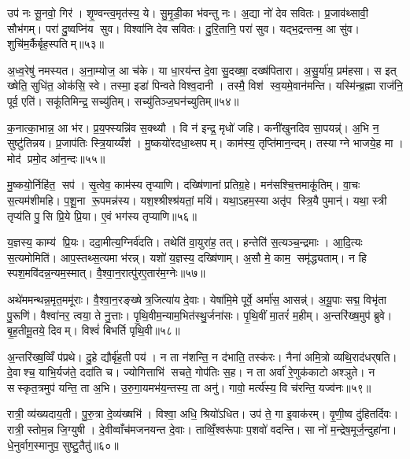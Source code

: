 उप॑ नः सू॒नवो॒ गिर॑। शृ॒ण्वन्त्व॒मृत॑स्य॒ ये। सु॒मृ॒डी॒का भ॑वन्तु नः। अ॒द्या नो॑ देव सवितः। प्र॒जाव॑थ्सावी॒ सौभ॑गम्। परा॑ दु॒ष्वप्नि॑य सुव। विश्वा॑नि देव सवितः। दु॒रि॒तानि॒ परा॑ सुव। यद्भ॒द्रन्तन्म॒ आ सु॑व। शुचि॑म॒र्कैर्बृह॒स्पतिम्॥५३॥

अ॒ध्व॒रेषु॑ नमस्यत। अ॒ना॒म्योज॒ आ च॑के। या धा॒रय॑न्त दे॒वा सु॒दख्षा॒ दख्ष॑पितारा। अ॒सु॒र्या॑य॒ प्रम॑हसा। स इत् ख्षेति॒ सुधि॑त॒ ओक॑सि॒ स्वे। तस्मा॒ इडा॑ पिन्वते विश्व॒दानी। तस्मै॒ विश॑ स्व॒यमे॒वान॑मन्ति। यस्मि॑न्ब्र॒ह्मा राज॑नि॒ पूर्व॒ एति॑। सकू॑तिमिन्द्र॒ सच्यु॑तिम्। सच्यु॑तिञ्ज॒घन॑च्युतिम्॥५४॥

क॒नात्का॒भान्न॒ आ भ॑र। प्र॒य॒फ्स्यन्नि॑व स॒क्थ्यौ। वि न॑ इन्द्र॒ मृधो॑ जहि। कनी॑खुनदिव सा॒पयन्न्॑। अ॒भि न॒ सुष्टु॑तिन्नय। प्र॒जाप॑तिः स्त्रि॒याय्यँश॑। मु॒ष्कयो॑रदधा॒थ्सपम्। काम॑स्य॒ तृप्ति॑मान॒न्दम्। तस्याग्ने भाजये॒ह मा। मोद॑ प्रमो॒द आ॑न॒न्दः॥५५॥

मु॒ष्कयो॒र्निहि॑त॒ सप॑। सृ॒त्वेव॒ काम॑स्य तृप्याणि। दख्षि॑णानां प्रतिग्र॒हे। मन॑सश्चि॒त्तमाकू॑तिम्। वा॒चः स॒त्यम॑शीमहि। प॒शू॒ना रू॒पमन्न॑स्य। यश॒श्श्रीश्श्र॑यतां॒ मयि॑। यथा॒ऽहम॒स्या अतृ॑प स्त्रि॒यै पुमान्॑। यथा॒ स्त्री तृप्य॑ति पु॒सि प्रि॒ये प्रि॒या। ए॒वं भग॑स्य तृप्याणि॥५६॥

य॒ज्ञस्य॒ काम्य॑ प्रि॒यः। ददा॒मीत्य॒ग्निर्व॑दति। तथेति॑ वा॒युरा॑ह॒ तत्। हन्तेति॑ स॒त्यञ्च॒न्द्रमाः। आ॒दि॒त्यः स॒त्यमोमिति॑। आप॒स्तथ्स॒त्यमा भ॑रन्न्। यशो॑ य॒ज्ञस्य॒ दख्षि॑णाम्। अ॒सौ मे॒ काम॒ समृ॑द्ध्यताम्। न हि स्पश॒मवि॑दन्न॒न्यम॒स्मात्। वै॒श्वा॒न॒रात्पु॑रए॒तार॑म॒ग्नेः॥५७॥

अथे॑ममन्थन्न॒मृत॒ममू॑राः। वै॒श्वा॒न॒रङ्ख्षेत्र॒जित्या॑य दे॒वाः। येषा॑मि॒मे पूर्वे॒ अर्मा॑स॒ आसन्न्॑। अ॒यू॒पाः सद्म॒ विभृ॑ता पु॒रूणि॑। वैश्वा॑नर॒ त्वया॒ ते नु॒त्ताः। पृ॒थि॒वीम॒न्याम॒भित॑स्थु॒र्जना॑सः। पृ॒थि॒वीं मा॒तरं॑ म॒हीम्। अ॒न्तरि॑ख्ष॒मुप॑ ब्रुवे। बृ॒ह॒तीमू॒तये॒ दिवम्। विश्वं॑ बिभर्ति पृथि॒वी॥५८॥

अ॒न्तरि॑ख्ष॒व्विँ प॑प्रथे। दु॒हे द्यौर्बृ॑ह॒ती पय॑। न ता न॑शन्ति॒ न द॑भाति॒ तस्क॑रः। नैना॑ अमि॒त्रो व्यथि॒राद॑धर्‌षति। दे॒वाश्च॒ याभि॒र्यज॑ते॒ ददा॑ति च। ज्योगित्ताभि॑ सचते॒ गोप॑तिः स॒ह। न ता अर्वा॑ रे॒णुक॑काटो अश्ञुते। न सस्कृत॒त्रमुप॑ यन्ति॒ ता अ॒भि। उ॒रु॒गा॒यमभ॑य॒न्तस्य॒ ता अनु॑। गावो॒ मर्त्य॑स्य॒ वि च॑रन्ति॒ यज्व॑नः॥५९॥

रात्री॒ व्य॑ख्यदाय॒ती। पु॒रु॒त्रा दे॒व्य॑ख्षभि॑। विश्वा॒ अधि॒ श्रियो॑ऽधित। उप॑ ते॒ गा इ॒वाक॑रम्। वृ॒णी॒ष्व दु॑हितर्दिवः। रात्री॒ स्तोम॒न्न जि॒ग्युषी। दे॒वीव्वाँच॑मजनयन्त दे॒वाः। ताव्विँ॒श्वरू॑पाः प॒शवो॑ वदन्ति। सा नो॑ म॒न्द्रेष॒मूर्ज॒न्दुहा॑ना। धे॒नुर्वाग॒स्मानुप॒ सुष्टु॒तैतु॑॥६०॥

